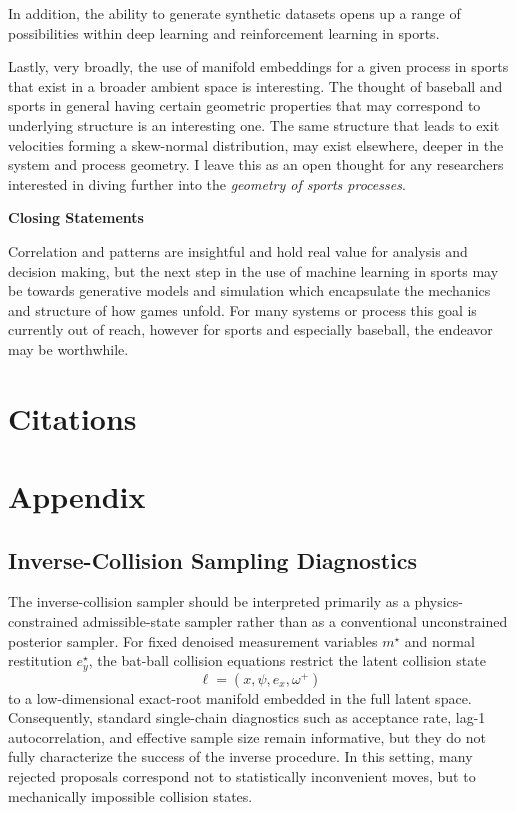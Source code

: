 \documentclass[11pt]{article}
\begin{document}
In addition, the ability to generate synthetic datasets opens up a range of possibilities within deep learning and reinforcement learning in sports.

Lastly, very broadly, the use of manifold embeddings for a given process in sports that exist in a broader ambient space is interesting. The thought of baseball and sports in general having certain geometric properties that may correspond to underlying structure is an interesting one. The same structure that leads to exit velocities forming a skew-normal distribution, may exist elsewhere, deeper in the system and process geometry. I leave this as an open thought for any researchers interested in diving further into the \textit{geometry of sports processes}.

\textbf{Closing Statements}

Correlation and patterns are insightful and hold real value for analysis and decision making, but the next step in the use of machine learning in sports may be towards generative models and simulation which encapsulate the mechanics and structure of how games unfold. For many systems or process this goal is currently out of reach, however for sports and especially baseball, the endeavor may be worthwhile. 

\newpage
\section{\textbf{Citations}}





\newpage
\section{Appendix}

\subsection{Inverse-Collision Sampling Diagnostics}

The inverse-collision sampler should be interpreted primarily as a physics-constrained admissible-state sampler rather than as a conventional unconstrained posterior sampler. For fixed denoised measurement variables \(m^\star\) and normal restitution \(e_y^\star\), the bat-ball collision equations restrict the latent collision state
\[
\ell = (x,\psi,e_x,\omega^+)
\]
to a low-dimensional exact-root manifold embedded in the full latent space. Consequently, standard single-chain diagnostics such as acceptance rate, lag-1 autocorrelation, and effective sample size remain informative, but they do not fully characterize the success of the inverse procedure. In this setting, many rejected proposals correspond not to statistically inconvenient moves, but to mechanically impossible collision states.
\end{document}
